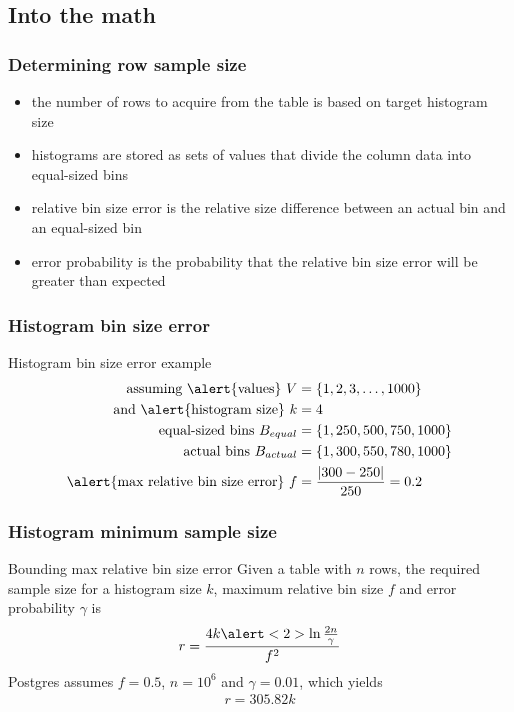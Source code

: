 \documentclass{beamer}
\begin{document}
\subsection{Into the math}

\begin{frame}
  \frametitle{Determining row sample size}

  \begin{itemize}
  \item the number of rows to acquire from the table is based on \alert{target
    histogram size}
  \item histograms are stored as \alert{sets of values} that divide the column data
    into \alert{equal-sized bins}
  \item \alert{relative bin size error} is the relative size difference between
    an actual bin and an equal-sized bin
  \item \alert{error probability} is the probability that the \alert{relative
    bin size} error will be \alert{greater than expected}
  \end{itemize}
\end{frame}

\begin{frame}
  \frametitle{Histogram bin size error}

  \begin{block}{Histogram bin size error example}
    \begin{align*}
    \text{assuming \alert{values}}\ V &= \{1, 2, 3, \dots, 1000\}\\
    \text{and \alert{histogram size}}\ k &= 4\\
    \text{equal-sized bins}\ B_{equal} &= \{1, 250, 500, 750, 1000\}\\
    \text{actual bins}\ B_{actual} &= \{1, 300, 550, 780, 1000\}\\
    \text{\alert{max relative bin size error}}\ f &= \frac{|300 - 250|}{250} = 0.2
    \end{align*}
  \end{block}
\end{frame}

\begin{frame}
  \frametitle{Histogram minimum sample size}

  \begin{block}{Bounding max relative bin size error}
    Given a table with \alert<2>{$n$ rows}, the required sample size for a
    histogram size $k$, maximum relative bin size $f$ and error probability
    $\gamma$ is
    \begin{align*}
      r = \frac{4k\alert<2>{\ln{\frac{2n}{\gamma}}}}{f^{2}}
    \end{align*}
    Postgres assumes $f = 0.5$, $n = 10^{6}$ and $\gamma = 0.01$, which yields
    \begin{align*}
      r = 305.82 k
    \end{align*}
  \end{block}
\end{frame}
\end{document}
